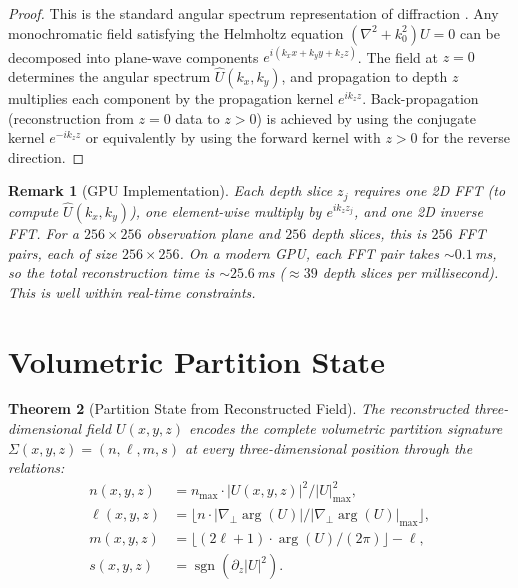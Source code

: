 \documentclass[11pt,twocolumn,a4paper]{article}
\newtheorem{theorem}{Theorem}[section]
\newtheorem{remark}[theorem]{Remark}
\DeclareMathOperator{\sgn}{sgn}
\begin{document}
\begin{proof}
This is the standard angular spectrum representation of diffraction
\citep{bornwolf1999,goodman2005}. Any monochromatic field satisfying
the Helmholtz equation $(\nabla^2 + k_0^2)U = 0$ can be decomposed
into plane-wave components $e^{i(k_x x + k_y y + k_z z)}$. The
field at $z=0$ determines the angular spectrum $\hat{U}(k_x, k_y)$,
and propagation to depth $z$ multiplies each component by the
propagation kernel $e^{ik_z z}$. Back-propagation (reconstruction from
$z=0$ data to $z > 0$) is achieved by using the conjugate kernel
$e^{-ik_z z}$ or equivalently by using the forward kernel with $z > 0$
for the reverse direction.
\end{proof}

\begin{remark}[GPU Implementation]
Each depth slice $z_j$ requires one 2D FFT (to compute
$\hat{U}(k_x, k_y)$), one element-wise multiply by $e^{ik_z z_j}$,
and one 2D inverse FFT. For a $256 \times 256$ observation plane and
$256$ depth slices, this is $256$ FFT pairs, each of size
$256 \times 256$. On a modern GPU, each FFT pair takes
$\sim\!0.1$\,ms, so the total reconstruction time is
$\sim\!25.6$\,ms ($\approx 39$ depth slices per millisecond). This is
well within real-time constraints.
\end{remark}


\section{Volumetric Partition State}
\label{sec:volumetric-state}

\begin{theorem}[Partition State from Reconstructed Field]
\label{thm:partition-from-field}
The reconstructed three-dimensional field $U(x,y,z)$ encodes the
complete volumetric partition signature
$\Sigma(x,y,z) = (n, \ell, m, s)$ at every three-dimensional
position through the relations:
\begin{align}
n(x,y,z) &= n_{\max} \cdot |U(x,y,z)|^2 / |U|^2_{\max},
  \label{eq:n-from-field} \\
\ell(x,y,z) &= \lfloor n \cdot |\nabla_\perp \arg(U)|
  / |\nabla_\perp \arg(U)|_{\max} \rfloor,
  \label{eq:ell-from-field} \\
m(x,y,z) &= \lfloor (2\ell+1) \cdot \arg(U)/(2\pi) \rfloor - \ell,
  \label{eq:m-from-field} \\
s(x,y,z) &= \sgn(\partial_z |U|^2).
  \label{eq:s-from-field}
\end{align}
\end{theorem}
\end{document}
